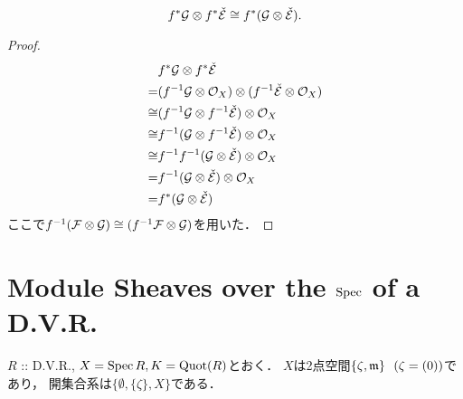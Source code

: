\documentclass[a4paper]{jsarticle}
\newcommand{\shE}{\mathcal{E}}
\newcommand{\shF}{\mathcal{F}}
\newcommand{\shG}{\mathcal{G}}
\newcommand{\shO}{\mathcal{O}}
\begin{document}
    \begin{Claim}
        \[ f^* \shG \otimes f^* \check{\shE} \iso f^* (\shG \otimes \check{\shE}). \]
    \end{Claim}
    \begin{proof}
        \begin{align*}
            {}&     f^* \shG \otimes f^* \check{\shE} \\
            =&      (f^{-1}\shG \otimes \shO_X) \otimes (f^{-1}\check{\shE} \otimes \shO_X) \\
            \iso&  (f^{-1}\shG \otimes f^{-1}\check{\shE}) \otimes \shO_X \\
            \iso&  f^{-1}(\shG \otimes f^{-1}\check{\shE}) \otimes \shO_X \\
            \iso&  f^{-1}f^{-1}(\shG \otimes \check{\shE}) \otimes \shO_X \\
            =&      f^{-1}(\shG \otimes \check{\shE}) \otimes \shO_X \\
            =&      f^*(\shG \otimes \check{\shE})
        \end{align*}
        ここで$f^{-1}(\shF \otimes \shG) \iso (f^{-1}\shF \otimes \shG)$を用いた．
    \end{proof}

\section{Module Sheaves over the $\operatorname{Spec}$ of a D.V.R.} %
    $R$ :: D.V.R., $X=\operatorname{Spec} R, K=\operatorname{Quot}(R)$とおく．
    $X$は2点空間$\{ \zeta, \mathfrak{m} \}~~(\zeta=(0))$であり，
    開集合系は$\{ \emptyset, \{\zeta\}, X \}$である．
\end{document}
